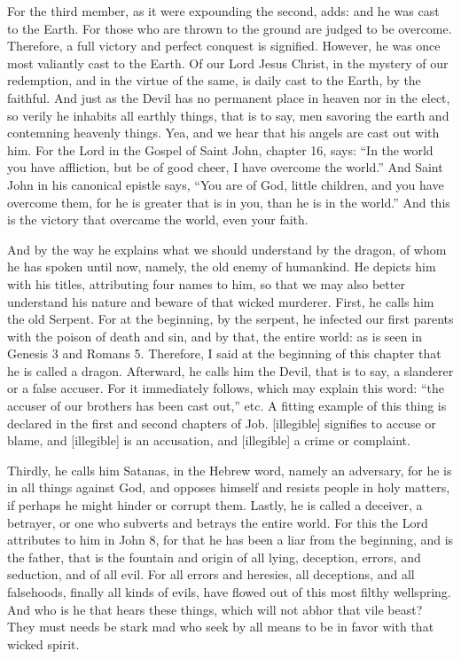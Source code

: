 For the third member, as it were expounding the second, adds: and he was cast to the Earth. For those who are thrown to the ground are judged to be overcome. Therefore, a full victory and perfect conquest is signified. However, he was once most valiantly cast to the Earth. Of our Lord Jesus Christ, in the mystery of our redemption, and in the virtue of the same, is daily cast to the Earth, by the faithful. And just as the Devil has no permanent place in heaven nor in the elect, so verily he inhabits all earthly things, that is to say, men savoring the earth and contemning heavenly things. Yea, and we hear that his angels are cast out with him. For the Lord in the Gospel of Saint John, chapter 16, says: “In the world you have affliction, but be of good cheer, I have overcome the world.” And Saint John in his canonical epistle says, “You are of God, little children, and you have overcome them, for he is greater that is in you, than he is in the world.” And this is the victory that overcame the world, even your faith.

And by the way he explains what we should understand by the dragon, of whom he has spoken until now, namely, the old enemy of humankind. He depicts him with his titles, attributing four names to him, so that we may also better understand his nature and beware of that wicked murderer. First, he calls him the old Serpent. For at the beginning, by the serpent, he infected our first parents with the poison of death and sin, and by that, the entire world: as is seen in Genesis 3 and Romans 5. Therefore, I said at the beginning of this chapter that he is called a dragon. Afterward, he calls him the Devil, that is to say, a slanderer or a false accuser. For it immediately follows, which may explain this word: “the accuser of our brothers has been cast out,” etc. A fitting example of this thing is declared in the first and second chapters of Job. [illegible] signifies to accuse or blame, and [illegible] is an accusation, and [illegible] a crime or complaint.

Thirdly, he calls him Satanas, in the Hebrew word, namely an adversary, for he is in all things against God, and opposes himself and resists people in holy matters, if perhaps he might hinder or corrupt them. Lastly, he is called a deceiver, a betrayer, or one who subverts and betrays the entire world. For this the Lord attributes to him in John 8, for that he has been a liar from the beginning, and is the father, that is the fountain and origin of all lying, deception, errors, and seduction, and of all evil. For all errors and heresies, all deceptions, and all falsehoods, finally all kinds of evils, have flowed out of this most filthy wellspring. And who is he that hears these things, which will not abhor that vile beast? They must needs be stark mad who seek by all means to be in favor with that wicked spirit.

